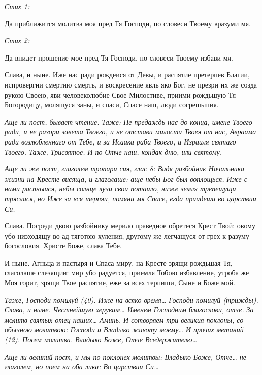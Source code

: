 \itshape Стих 1:\normalfont{}


Да приближится молитва моя пред Тя Господи, по словеси Твоему вразуми мя.


\itshape Стих 2:\normalfont{}


Да внидет прошение мое пред Тя Господи, по словеси Твоему избави мя.


Слава, и ныне. Иже нас ради рождеися от Девы, и распятие претерпев Благии, испровергии смертию смерть, и воскресение явль яко Бог, не презри их же созда рукою Своею, яви человеколюбие Свое Милостиве, приими рождьшую Тя Богородицу, молящуся заны, и спаси, Спасе наш, люди согрешьшия.


\itshape Аще ли пост, бывает чтение. Таже:\normalfont{} Не предаждь нас до конца, имене Твоего ради, и не разори завета Твоего, и не отстави милости Твоея от нас, Авраама ради возлюбленнаго от Тебе, и за Исаака раба Твоего, и Израиля святаго Твоего. Таже, Трисвятое. И по Отче наш, кондак дню, или святому.


\itshape Аще ли же пост, глаголем тропари сия, глас 8:\normalfont{} Видя разбойник Начальника жизни на Кресте висяща, и глаголаше: аще небы Бог был воплощься, Иже с нами распныися, небы солнце лучи свои потаило, ниже земля трепещущи тряслася, но Иже за вся терпяи, помяни мя Спасе, егда приидеши во царствии Си. 

Слава. Посреди двою разбойнику мерило праведное обретеся Крест Твой: овому убо низходящу во ад тяготою хуления, другому же легчащуся от грех к разуму богословия. Христе Боже, слава Тебе. 

И ныне. Агньца и пастыря и Спаса миру, на Кресте зрящи рождьшая Тя, глаголаше слезящии: мир убо радуется, приемля Тобою избавление, утроба же Моя горит, зрящи Твое распятие, еже за всех терпиши, Сыне и Боже мой. 


\itshape Таже,\normalfont{} Господи помилуй (40). Иже на всяко время… Господи помилуй (трижды). Слава, и ныне. Честнейшую херувим… Именем Господним благослови, отче. За молитв святых отец наших… Аминь. И сотворяем три великия поклоны, со обычною молитвою: Господи и Владыко животу моему… И прочих метаний (12). Посем молитва. Владыко Боже, Отче Вседержителю…


\itshape Аще ли великий пост, и мы по поклонех молитвы:\normalfont{} Владыко Боже, Отче… не глаголем, но поем на оба лика: Во царствии Си…


